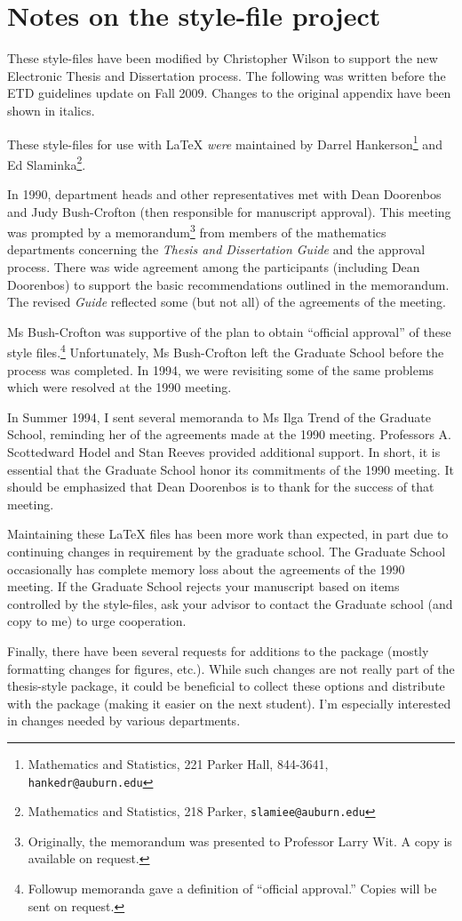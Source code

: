\documentclass[12pt]{report}
\begin{document}
\chapter{Notes on the style-file project}

\begin{singlespace}
These style-files have been modified by Christopher Wilson to support the new Electronic Thesis and Dissertation process. The following was written before the ETD guidelines update on Fall 2009. Changes to the original appendix have been shown in italics. 

These style-files for use with \LaTeX{} {\it were} maintained by Darrel
Hankerson\footnote{Mathematics and Statistics, 221 Parker Hall,
844-3641, {\tt hankedr@auburn.edu}} and Ed
Slaminka\footnote{Mathematics and Statistics, 218 Parker,
{\tt slamiee@auburn.edu}}.

In 1990, department heads and other representatives met with Dean Doorenbos
and Judy Bush-Crofton (then responsible for manuscript approval). This
meeting was prompted by a memorandum\footnote{Originally, the memorandum
was presented to Professor Larry Wit. A copy is available on request.} from
members of the mathematics departments concerning the {\em Thesis and
Dissertation Guide\/} and the approval process. There was wide agreement
among the participants (including Dean Doorenbos) to support the basic
recommendations outlined in the memorandum. The revised {\em Guide\/}
reflected some (but not all) of the agreements of the meeting.

Ms Bush-Crofton was supportive of the plan to obtain ``official approval''
of these style files.\footnote{Followup memoranda gave a definition of
``official approval.'' Copies will be sent on request.}  Unfortunately, Ms
Bush-Crofton left the Graduate School before the process was completed. In
1994, we were revisiting some of the same problems which were
resolved at the 1990 meeting.

In Summer 1994, I sent several memoranda to Ms Ilga Trend of the Graduate
School, reminding her of the agreements made at the 1990 meeting.
Professors A. Scottedward Hodel and Stan Reeves provided additional
support.  In short, it is essential that the Graduate School honor its
commitments of the 1990 meeting. It should be emphasized that Dean
Doorenbos is to thank for the success of that meeting.

Maintaining these \LaTeX{} files has been more work than expected, in
part due to continuing changes in requirement by the graduate school.
The Graduate School occasionally has complete memory loss about the
agreements of the 1990 meeting. If the Graduate School rejects your
manuscript based on items controlled by the style-files, ask
your advisor to contact the Graduate school (and copy to me) to urge
cooperation.

Finally, there have been several requests for additions to the package
(mostly formatting changes for figures, etc.). While such changes are not
really part of the thesis-style package, it could be beneficial to collect
these options and distribute with the package (making it easier on the next
student).  I'm especially interested in changes needed by various
departments.

\end{singlespace}
\end{document}
